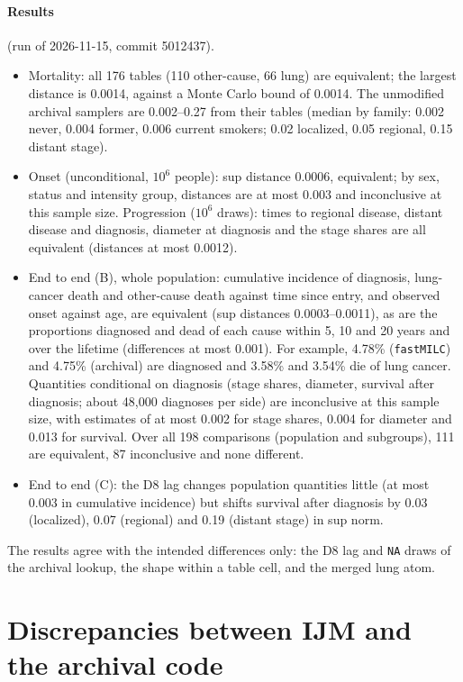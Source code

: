 \documentclass[11pt]{article}
\newcommand{\code}[1]{\texttt{#1}}
\begin{document}
\paragraph{Results} (run of 2026-11-15, commit 5012437).
\begin{itemize}[nosep]
\item Mortality: all 176 tables (110 other-cause, 66 lung) are equivalent; the
  largest distance is 0.0014, against a Monte Carlo bound of 0.0014. The
  unmodified archival samplers are 0.002--0.27 from their tables (median by
  family: 0.002 never, 0.004 former, 0.006 current smokers; 0.02 localized, 0.05
  regional, 0.15 distant stage).
\item Onset (unconditional, $10^6$ people): sup distance 0.0006, equivalent;
  by sex, status and intensity group, distances are at most 0.003 and
  inconclusive at this sample size. Progression ($10^6$ draws): times to
  regional disease, distant disease and diagnosis, diameter at diagnosis and
  the stage shares are all equivalent (distances at most 0.0012).
\item End to end (B), whole population: cumulative incidence of diagnosis,
  lung-cancer death and other-cause death against time since entry, and
  observed onset against age, are equivalent (sup distances 0.0003--0.0011), as
  are the proportions diagnosed and dead of each cause within 5, 10 and 20
  years and over the lifetime (differences at most 0.001). For example, 4.78\%
  (\code{fastMILC}) and 4.75\% (archival) are diagnosed and 3.58\% and 3.54\%
  die of lung cancer. Quantities conditional on diagnosis (stage shares,
  diameter, survival after diagnosis; about 48{,}000 diagnoses per side) are
  inconclusive at this sample size, with estimates of at most 0.002 for stage
  shares, 0.004 for diameter and 0.013 for survival. Over all 198 comparisons
  (population and subgroups), 111 are equivalent, 87 inconclusive and none
  different.
\item End to end (C): the D8 lag changes population quantities little (at
  most 0.003 in cumulative incidence) but shifts survival after diagnosis by
  0.03 (localized), 0.07 (regional) and 0.19 (distant stage) in sup norm.
\end{itemize}
The results agree with the intended differences only: the D8 lag and
\code{NA} draws of the archival lookup, the shape within a table cell, and the
merged lung atom.

\section{Discrepancies between IJM and the archival code}\label{sec:discrepancies}
\end{document}
